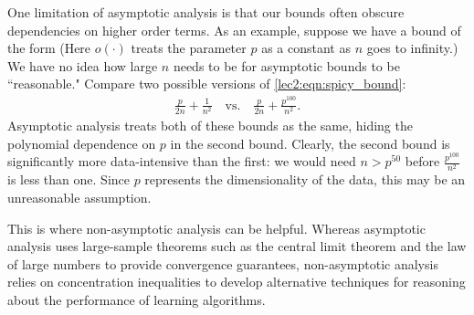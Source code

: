 

One limitation of asymptotic analysis is that our bounds often obscure dependencies on higher order terms. As an example, suppose we have a bound of the form
(Here $o(\cdot)$ treats the parameter $p$ as a constant as $n$ goes to infinity.) 
We have no idea how large $n$ needs to be for asymptotic bounds to be ``reasonable." Compare two possible versions of \eqref{lec2:eqn:spicy_bound}: 
\begin{align}
    \frac{p}{2n} + \frac{1}{n^2} \quad \text{vs.} \quad \frac{p}{2n} + \frac{p^{100}}{n^2}.
\end{align}
Asymptotic analysis treats both of these bounds as the same, hiding the polynomial dependence on $p$ in the second bound. Clearly, the second bound is significantly more data-intensive than the first: we would need $n > p^{50}$ before $\frac{p^{100}}{n^2}$ is less than one. Since $p$ represents the dimensionality of the data, this may be an unreasonable assumption.

This is where non-asymptotic analysis can be helpful. Whereas asymptotic analysis uses large-sample theorems such as the central limit theorem and the law of large numbers to provide convergence guarantees, non-asymptotic analysis relies on concentration inequalities to develop alternative techniques for reasoning about the performance of learning algorithms.

